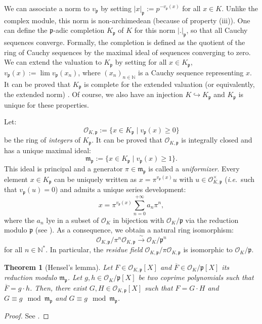 \documentclass[a4paper,10pt]{report}
\theoremstyle{definition}
\theoremstyle{plain}
\newtheorem{Theorem}[Definition]{Theorem}
\theoremstyle{definition}
\newcommand{\ie}{\emph{i.e.}\ }
\newcommand{\N}{\mathbb{N}}
\newcommand{\mO}{\mathcal{O}}
\renewcommand{\(}{\left(}
\renewcommand{\)}{\right)}
\newcommand{\mf}[1]{\mathfrak{#1}}
\begin{document}
We can associate a norm to $v_{\mf{p}}$ by setting $|x|_{\mf{p}}:=p^{-v_{\mf{p}}(x)}$ for all $x\in K$. Unlike the complex module, this norm is non-archimedean (because of property (iii)). One can define the $\mf{p}$-adic completion $K_{\mf{p}}$ of $K$ for this norm $|.|_{\mf{p}}$, so that all Cauchy sequences converge.  Formally, the completion is defined as the quotient of the ring of Cauchy sequences by the maximal ideal of sequences converging to zero. We can extend the valuation to $K_{\mf{p}}$ by setting for all $x\in K_{\mf{p}}$, $v_{\mf{p}}(x):=\lim v_{\mf{p}}(x_n)$, where $(x_n)_{n\in\N}$ is a Cauchy sequence representing $x$.  It can be proved that $K_{\mf{p}}$ is complete for the extended valuation (or equivalently, the extended norm) \cite[Theorem II.2.1]{Janusz}. Of course, we also have an injection $K\hookrightarrow K_{\mf{p}}$ and $K_{\mf{p}}$ is unique for these properties. 

Let:
\[\mO_{K,\mf{p}}:=\{x\in K_{\mf{p}}\mid v_{\mf{p}}(x)\geq 0\}\]
be the ring of \emph{integers} of $K_{\mf{p}}$. It can be proved that $\mO_{K,\mf{p}}$ is integrally closed and has a unique maximal ideal:
\[\mf{m}_{\mf{p}}:=\{x\in K_{\mf{p}}\mid v_{\mf{p}}(x)\geq 1\}.\]
This ideal is principal and a generator $\pi\in\mf{m}_{\mf{p}}$ is called a \emph{uniformizer}. Every element $x\in K_{\mf{p}}$ can be uniquely written as $x=\pi^{v_{\mf{p}}(x)}u$ with $u\in \mO_{K,\mf{p}}^\times$ (\ie such that $v_{\mf{p}}(u)=0$) and admits a unique series development:
\[x=\pi^{v_{\mf{p}}(x)}\sum_{n=0}^{+\infty} a_n\pi^n,\]
where the $a_n$ lye in a subset of $\mO_K$ in bijection with $\mO_K/\mf{p}$ via the reduction modulo $\mf{p}$ (see \cite[Proposition II.2.8]{Janusz}). As a consequence, we obtain a natural ring isomorphism:
\[\mO_{K,\mf{p}}/\pi^n\mO_{K,\mf{p}}\overset{\sim}{\longrightarrow}\mO_K/\mf{p}^n\]
for all $n\in\N^*$. In particular, the \emph{residue field} $\mO_{K,\mf{p}}/\pi\mO_{K,\mf{p}}$ is isomorphic to $\mO_K/\mf{p}$.

\begin{Theorem}[Hensel's lemma]\label{Theorem 9}
Let $F\in \mO_{K,\mf{p}}[X]$ and $\overline{F}\in\mO_K/\mf{p}[X]$ its reduction modulo $\mf{m}_{\mf{p}}$. Let $g,h\in \mO_K/\mf{p}[X]$ be two coprime polynomials such that $\overline{F}=g\cdot h$. Then, there exist $G,H\in \mO_{K,\mf{p}}[X]$ such that $F=G\cdot H$ and $G\equiv g \mod \mf{m}_{\mf{p}}$ and $G\equiv g \mod \mf{m}_{\mf{p}}$.
\end{Theorem}

\begin{proof}
See \cite[Lemma II.3.5]{Janusz}.
\end{proof}
\end{document}
